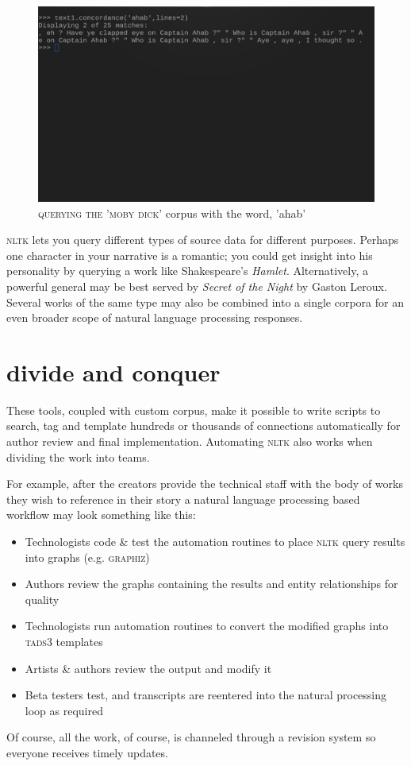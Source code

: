 \begin{figure}[ht]
\centering
\includegraphics[width=\textwidth]{media/images/python_concord.png}
  \caption{\textsc{querying the 'moby dick'} corpus with the word, 'ahab'}
\end{figure}
\textsc{nltk} lets you query different types of source data for
different purposes. Perhaps one character in your narrative is a romantic; you
could get insight into his personality by querying a work like
Shakespeare's \textit{Hamlet}. Alternatively, a powerful general may
be best served by \textit{Secret of the Night} by Gaston Leroux. Several works
of the same type may also be combined into a single
corpora for an even broader scope of natural language processing responses.
\section{divide and conquer}
These tools, coupled with custom corpus, make it possible to write scripts to search, tag and template hundreds or thousands of
connections automatically for author review and final implementation.
Automating \textsc{nltk} also works when dividing the work into teams. 

For example, after the creators provide the technical staff with the body of
works they wish to reference in their story a natural language processing based
workflow may look something like this:

\begin{itemize}\setlength\itemsep{0em}
\item Technologists code \& test the automation routines to place \textsc{nltk}
  query results into graphs (e.g. \textsc{graphiz}) 
\item Authors review the graphs containing the results and entity relationships for quality
\item Technologists run automation routines to convert the modified graphs into \textsc{tads3} templates
\item Artists \& authors review the output and modify it
\item Beta testers test, and transcripts are re\textendash entered into the
  natural processing loop as required
\end{itemize}
Of course, all the work, of course, is channeled through a revision system so
everyone receives timely updates.